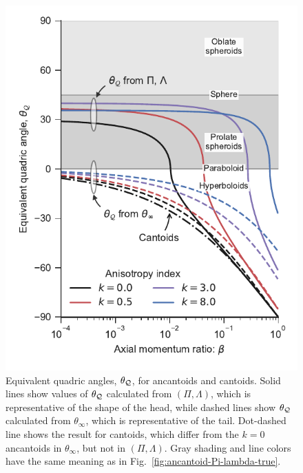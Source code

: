 \begin{figure}
  \centering
  \includegraphics[width=\linewidth]{figs/ancantoid-angles}
  \caption{Equivalent quadric angles, \(\theta_{\mathcal{Q}}\), for ancantoids and
    cantoids.  Solid lines show values of \(\theta_{\mathcal{Q}}\) calculated from
    \((\Pi, \Lambda)\), which is representative of the shape of the head,
    while dashed lines show \(\theta_{\mathcal{Q}}\) calculated from
    \(\theta_\infty\), which is representative of the tail.  Dot-dashed line
    shows the result for cantoids, which differ from the \(k=0\)
    ancantoids in \(\theta_\infty\), but not in \((\Pi, \Lambda)\). Gray shading and
    line colors have the same meaning as in
    Fig.~\ref{fig:ancantoid-Pi-lambda-true}. }
  \label{fig:ancantoid-angles}
\end{figure}




